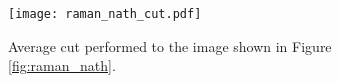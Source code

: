 \begin{figure}[!htbp]\centering
	\texttt{[image: raman\_nath\_cut.pdf]}
	\caption[Average cut performed to the image shown in Figure \ref{fig:raman_nath}]{Average cut performed to the image shown in Figure \ref{fig:raman_nath}.}\label{fig:raman_nath_cut}
\end{figure}


